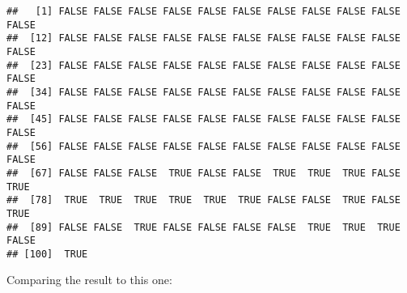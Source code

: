\documentclass[]{article}
\newenvironment{Shaded}{\begin{snugshade}}{\end{snugshade}}
\newcommand{\DecValTok}[1]{\textcolor[rgb]{0.00,0.00,0.81}{#1}}
\newcommand{\NormalTok}[1]{#1}
\newcommand{\OperatorTok}[1]{\textcolor[rgb]{0.81,0.36,0.00}{\textbf{#1}}}
\begin{document}
\begin{verbatim}
##   [1] FALSE FALSE FALSE FALSE FALSE FALSE FALSE FALSE FALSE FALSE FALSE
##  [12] FALSE FALSE FALSE FALSE FALSE FALSE FALSE FALSE FALSE FALSE FALSE
##  [23] FALSE FALSE FALSE FALSE FALSE FALSE FALSE FALSE FALSE FALSE FALSE
##  [34] FALSE FALSE FALSE FALSE FALSE FALSE FALSE FALSE FALSE FALSE FALSE
##  [45] FALSE FALSE FALSE FALSE FALSE FALSE FALSE FALSE FALSE FALSE FALSE
##  [56] FALSE FALSE FALSE FALSE FALSE FALSE FALSE FALSE FALSE FALSE FALSE
##  [67] FALSE FALSE FALSE  TRUE FALSE FALSE  TRUE  TRUE  TRUE FALSE  TRUE
##  [78]  TRUE  TRUE  TRUE  TRUE  TRUE  TRUE FALSE FALSE  TRUE FALSE  TRUE
##  [89] FALSE FALSE  TRUE FALSE FALSE FALSE FALSE  TRUE  TRUE  TRUE FALSE
## [100]  TRUE
\end{verbatim}

Comparing the result to this one:

\begin{Shaded}
\end{Shaded}
\end{document}
